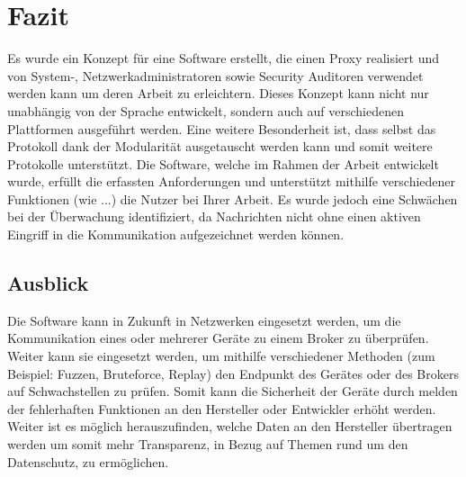 \chapter{Fazit}
Es wurde ein Konzept für eine Software erstellt, die einen Proxy realisiert und von System-, Netzwerkadministratoren sowie Security Auditoren verwendet werden kann um deren Arbeit zu erleichtern. Dieses Konzept kann nicht nur unabhängig von der Sprache entwickelt, sondern auch auf verschiedenen Plattformen ausgeführt werden. Eine weitere Besonderheit ist, dass selbst das Protokoll dank der Modularität ausgetauscht werden kann und somit weitere Protokolle unterstützt.
Die Software, welche im Rahmen der Arbeit entwickelt wurde, erfüllt die erfassten Anforderungen und unterstützt mithilfe verschiedener Funktionen (wie ...) die Nutzer bei Ihrer Arbeit. Es wurde jedoch eine Schwächen bei der Überwachung identifiziert, da Nachrichten nicht ohne einen aktiven Eingriff in die Kommunikation aufgezeichnet werden können.


\section{Ausblick}
Die Software kann in Zukunft in Netzwerken eingesetzt werden, um die Kommunikation eines oder mehrerer Geräte zu einem Broker zu überprüfen.
Weiter kann sie eingesetzt werden, um mithilfe verschiedener Methoden (zum Beispiel: Fuzzen, Bruteforce, Replay) den Endpunkt des Gerätes oder des Brokers auf Schwachstellen zu prüfen. Somit kann die Sicherheit der Geräte durch melden der fehlerhaften Funktionen an den Hersteller oder Entwickler erhöht werden. Weiter ist es möglich herauszufinden, welche Daten an den Hersteller übertragen werden um somit mehr Transparenz, in Bezug auf Themen rund um den Datenschutz, zu ermöglichen.

